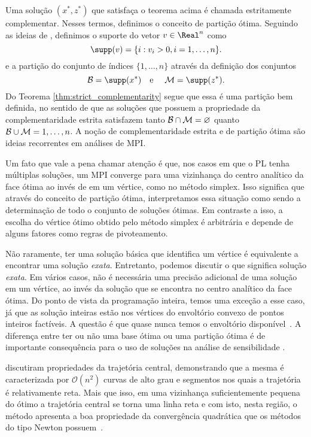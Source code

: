  

Uma solução $(x^*,z^*)$ que satisfaça o teorema acima é chamada estritamente
complementar. Nesses termos,   definimos o conceito de partição ótima.
Seguindo as ideias de \textcite{Jansen:1997vy}, definimos o suporte do vetor
$v\in\Real^n$ como
\[
\supp(v) = \{i:v_i>0, i=1,\ldots,n\}.
\]
e a partição do conjunto de índices $\{1,\ldots,n\}$ através da definição dos
conjuntos 
\[
\Bset = \supp(x^*) \text{\quad e \quad } \Mset = \supp(z^*).
\]
Do Teorema \ref{thm:strict_complementarity} segue que essa é uma partição bem
definida, no sentido de que as soluções que possuem a propriedade da
complementaridade estrita satisfazem tanto $\mathcal{B}\cap \mathcal{M} = \varnothing$
quanto $\mathcal{B}\cup\mathcal{M} = {1,\ldots,n}$. A noção de complementaridade estrita e
de partição ótima são ideias recorrentes em análises de \ac{MPI}.

Um  fato que vale a pena chamar atenção é que, nos casos em que o \ac{PL}
tenha múltiplas soluções, um \ac{MPI} converge para uma vizinhança do 
centro analítico da face ótima ao invés de em um vértice, como no método
simplex. Isso significa que através do conceito de partição
ótima, interpretamos essa situação como sendo a determinação de
todo o conjunto de soluções ótimas. Em contraste a isso, a escolha do vértice ótimo obtido pelo
método simplex é arbitrária e depende de alguns fatores como regras de
pivoteamento. 

Não raramente, ter uma solução básica que identifica um vértice é equivalente a
encontrar uma solução \emph{exata}. Entretanto, podemos discutir o que significa 
solução \emph{exata}. Em vários casos, não é necessária uma precisão adicional de
 uma solução em um vértice, ao invés da solução que se encontra no centro
analítico da face ótima.  Do ponto de vista da programação inteira, temos uma
exceção a esse caso, já que as solução inteiras estão nos vértices do
envoltório convexo de pontos inteiros factíveis. A questão é que quase nunca temos o envoltório disponível~\cite{MunariJunior:2013wr}. A diferença entre ter ou não
uma base ótima ou uma partição ótima é de importante consequência para o uso de
soluções na análise de sensibilidade \cite{Jansen:1997vy,Yildirim:2001gp}.


\textcite{Vavasis:1996bw}
discutiram propriedades da trajetória central, demonstrando que a mesma é caracterizada por
$\mathcal{O}(n^2)$ curvas de alto grau e segmentos nos quais a trajetória é
relativamente reta. Mais que isso, em uma vizinhança
suficientemente pequena do ótimo a trajetória central se torna uma linha reta
e com isto, nesta região, o método apresenta a boa propriedade da convergência quadrática que os métodos do tipo
Newton possuem~\cite{Meggido:Pathways-to-the-optimal:1988u}.
 


